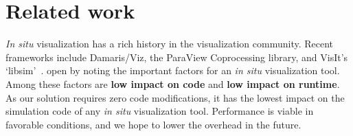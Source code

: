 %


\section{Related work}

\textit{In situ} visualization has a rich history in the visualization
community.  Recent frameworks include Damaris/Viz, the ParaView
Coprocessing library, and VisIt's `libsim'~\cite{Dorier:2013:Damaris,
Fabian:2011:Catalyst, Whitlock:2011:Libsim}. \cite{Dorier:2013:Damaris}
open
by noting the important factors for an \textit{in situ} visualization
tool. Among these factors are \textbf{low impact on code} and
\textbf{low impact on runtime}.  As our solution requires zero code
modifications, it has the lowest impact on the simulation code of any
\textit{in situ} visualization tool.  Performance is viable in
favorable conditions, and we hope to lower the overhead in the future.

